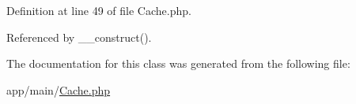 Definition at line 49 of file Cache.php.

Referenced by \_\-\_\-construct().

The documentation for this class was generated from the following file:\begin{DoxyCompactItemize}
\item 
app/main/\hyperlink{Cache_8php}{Cache.php}\end{DoxyCompactItemize}
